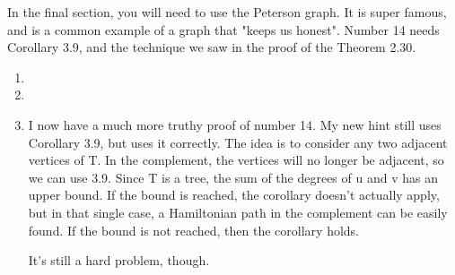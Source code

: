 \documentclass[letterpaper]{article}
\begin{document}
\begin{enumerate}
In the final section, you will need to use the Peterson graph.  It is super famous, and is a common example of a graph that "keeps us honest". Number 14 needs Corollary 3.9, and the technique we saw in the proof of the Theorem 2.30.
  \begin{enumerate}
  \item
  \setcounter{enumii}{6}
  \item
  \setcounter{enumii}{13}
  \item
I now have a much more truthy proof of number 14.  My new hint still uses Corollary 3.9, but uses it correctly.  The idea is to consider any two adjacent vertices of T.  In the complement, the vertices will no longer be adjacent, so we can use 3.9.  Since T is a tree, the sum of the degrees of u and v has an upper bound.  If the bound is reached, the corollary doesn't actually apply, but in that single case, a Hamiltonian path in the complement can be easily found.  If the bound is not reached, then the corollary holds.

It's still a hard problem, though.


  \end{enumerate}
\end{enumerate}
\end{document}
